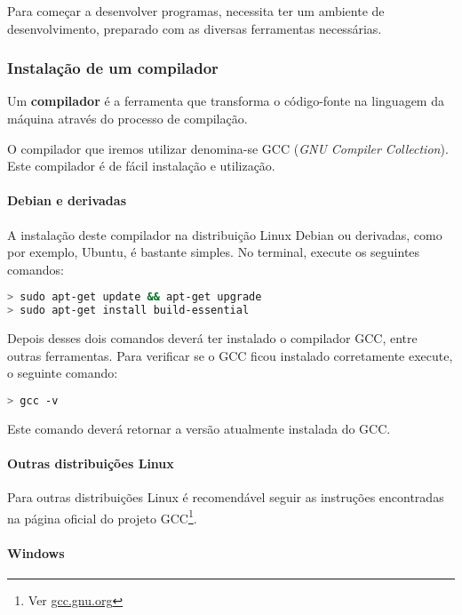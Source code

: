 Para começar a desenvolver programas, necessita ter um ambiente de desenvolvimento, preparado com as diversas ferramentas necessárias.

\subsubsection{Instalação de um compilador}

\begin{defi}
Um \textbf{compilador} é a ferramenta que transforma o código-fonte na linguagem da máquina através do processo de compilação.
\end{defi}

O compilador que iremos utilizar denomina-se GCC (\textit{GNU Compiler Collection}). Este compilador é de fácil instalação e utilização.

\paragraph{Debian e derivadas} 

A instalação deste compilador na distribuição Linux Debian ou derivadas, como por exemplo, Ubuntu, é bastante simples. No terminal, execute os seguintes comandos:

\begin{lstlisting}[language=bash,numbers=none]
> sudo apt-get update && apt-get upgrade
> sudo apt-get install build-essential
\end{lstlisting}

Depois desses dois comandos deverá ter instalado o compilador GCC, entre outras ferramentas. Para verificar se o GCC ficou instalado corretamente execute, o seguinte comando:

\begin{lstlisting}[language=bash,numbers=none]
> gcc -v
\end{lstlisting}

Este comando deverá retornar a versão atualmente instalada do GCC.

\paragraph{Outras distribuições Linux}

Para outras distribuições Linux é recomendável seguir as instruções encontradas na página oficial do projeto GCC\footnote{Ver \color{links}\href{https://gcc.gnu.org/}{gcc.gnu.org}}.

\paragraph{Windows}

